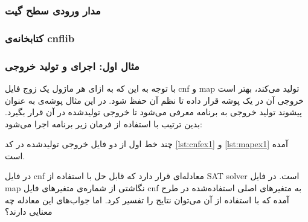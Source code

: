 \documentclass{article}
\begin{document}
\subsubsection{مدار ورودی سطح گیت}

\begin{LTR}{}\end{LTR}

\subsubsection{کتابخانه‌ی cnflib}

\begin{LTR}{}\end{LTR}

\subsubsection{مثال اول: اجرای  و تولید خروجی}

با توجه به این که  به ازای هر ماژول یک زوج فایل cnf و map تولید می‌کند، بهتر است خروجی آن در یک پوشه قرار داده تا نظم آن حفظ شود. در این مثال پوشه‌ی  به عنوان پیشوند تولید خروجی به برنامه معرفی می‌شود تا خروجی تولیدشده در آن قرار بگیرد. بدین ترتیب با استفاده از فرمان زیر برنامه اجرا می‌شود: 

\begin{flushleft}
\end{flushleft}

چند خط اول از دو فایل خروجی تولیدشده در کد \ref{lst:cnfex1} و \ref{lst:mapex1} آمده است. 

\begin{LTR}{}\end{LTR}
\begin{LTR}{}\end{LTR}

در فایل cnf معادله‌ای قرار دارد که قابل حل با استفاده از SAT solver است. در فایل map نگاشتی از شماره‌ی متغیرهای فایل cnf به متغیرهای اصلی استفاده‌شده در طرح آمده که با استفاده از آن می‌توان نتایج را تفسیر کرد. اما جواب‌های این معادله چه معنایی دارند؟ 
\end{document}
